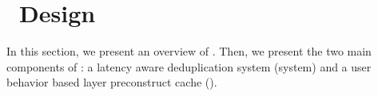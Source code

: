\section{\sysname~Design}
\label{sec:Sift}

%



In this section, we present an overview of \sysname.
Then, we present the two main components of \sysname: 
a latency aware deduplication system (\dedupname system) and a user
behavior based layer preconstruct cache (\preconstructcachename).






